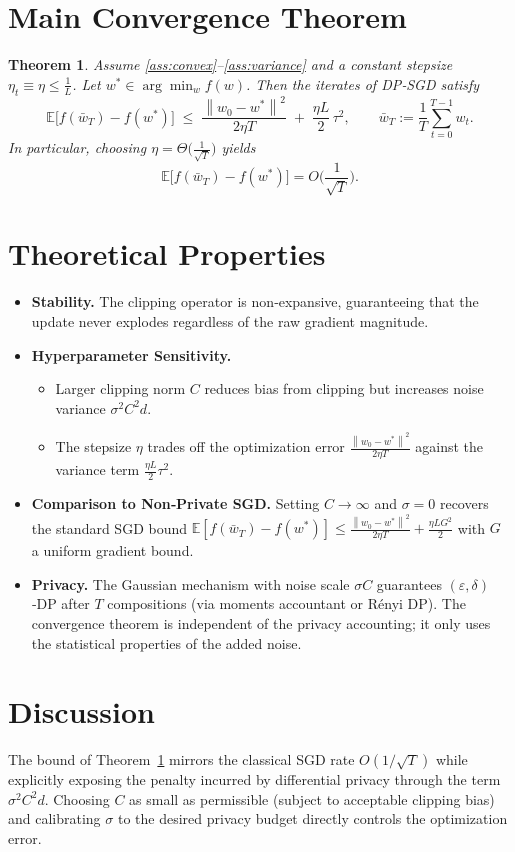 \documentclass{article}
\newcommand{\E}{\mathbb{E}}
\newcommand{\norm}[1]{\left\lVert #1\right\rVert}
\newtheorem{theorem}{Theorem}
\begin{document}
\section*{Main Convergence Theorem}
\begin{theorem}\label{thm:conv}
Assume \ref{ass:convex}–\ref{ass:variance} and a constant stepsize $\eta_t\equiv\eta\le\frac{1}{L}$.
Let $w^{*}\in\arg\min_{w}f(w)$. Then the iterates of DP‑SGD satisfy
\[
\E\!\big[f(\bar w_T)-f(w^{*})\big]\;\le\;
\frac{\norm{w_0-w^{*}}^{2}}{2\eta T}
\;+\;\frac{\eta L}{2}\,\tau^{2},
\qquad
\bar w_T:=\frac{1}{T}\sum_{t=0}^{T-1}w_t .
\]
In particular, choosing $\eta=\Theta\!\big(\frac{1}{\sqrt{T}}\big)$ yields
\[
\E\!\big[f(\bar w_T)-f(w^{*})\big]=O\!\Big(\frac{1}{\sqrt{T}}\Big).
\]
\end{theorem}

\section*{Theoretical Properties}
\begin{itemize}
\item \textbf{Stability.} The clipping operator is non‑expansive, guaranteeing that the update never explodes regardless of the raw gradient magnitude.
\item \textbf{Hyperparameter Sensitivity.}
    \begin{itemize}
        \item Larger clipping norm $C$ reduces bias from clipping but increases noise variance $\sigma^{2}C^{2}d$.
        \item The stepsize $\eta$ trades off the optimization error $\frac{\norm{w_0-w^{*}}^{2}}{2\eta T}$ against the variance term $\frac{\eta L}{2}\tau^{2}$.
    \end{itemize}
\item \textbf{Comparison to Non‑Private SGD.}
    Setting $C\to\infty$ and $\sigma=0$ recovers the standard SGD bound
    $\E[f(\bar w_T)-f(w^{*})]\le\frac{\norm{w_0-w^{*}}^{2}}{2\eta T}+\frac{\eta L G^{2}}{2}$
    with $G$ a uniform gradient bound.
\item \textbf{Privacy.} The Gaussian mechanism with noise scale $\sigma C$ guarantees $(\varepsilon,\delta)$‑DP after $T$ compositions (via moments accountant or R\'enyi DP). The convergence theorem is independent of the privacy accounting; it only uses the statistical properties of the added noise.
\end{itemize}

\section*{Discussion}
The bound of Theorem~\ref{thm:conv} mirrors the classical SGD rate $O(1/\sqrt{T})$ while explicitly exposing the penalty incurred by differential privacy through the term $\sigma^{2}C^{2}d$. Choosing $C$ as small as permissible (subject to acceptable clipping bias) and calibrating $\sigma$ to the desired privacy budget directly controls the optimization error.
\end{document}
